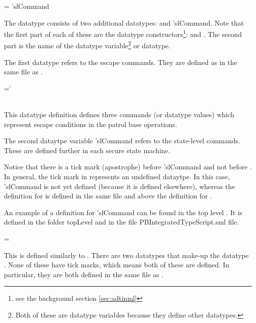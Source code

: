 \documentclass[../../main/main.tex]{subfiles}
\begin{document}
\begin{tabbing}
 =   \HOLTokenBar{}  'slCommand
\end{tabbing}

The  datatype consists of two additional datatypes:   and  'slCommand.  Note that the first part of each of these are the datatype constructors\footnote{see the background section \ref{sec:adtinml}}:  and .  The second part is the name of the datatype variable\footnote{Both of these are datatype variables because they define other datatypes.} or datatype.  

The first datatype refers to the escape commands.  They are defined as  in the same file as .

 \begin{tabbing}
  = \=  \\
 						\>\HOLTokenBar{}  \\
						\>\HOLTokenBar{} 
           \HOLTokenBar{} 
\end{tabbing}

This datatype definition defines three commands (or datatype values) which represent escape conditions in the patrol base operations.  

The second dataytpe variable 'slCommand refers to the state-level commands.  These are defined further in each secure state machine.  

Notice that there is a tick mark (apostrophe) before 'slCommand and not before .  In general, the tick mark in  represents an undefined dataytpe.  In this case, 'slCommand is not yet defined (because it is defined elsewhere), whereas the definition for  is defined in the same file and above the definition for .   

An example of a definition for 'slCommand can be found in the top level .  It is defined in the folder topLevel and in the file PBIntegratedTypeScript.sml file.

 =   \HOLTokenBar{}  

This is defined similarly to .  There are two datatypes that make-up the datatype .  None of these have tick marks, which means both of these are defined.  In particular, they are both defined in the same file as .
\end{document}
